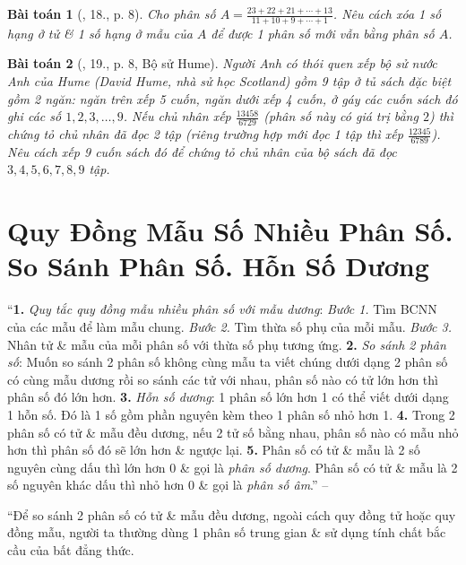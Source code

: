 \documentclass{article}
\newtheorem{baitoan}{Bài toán}
\begin{document}
\begin{baitoan}[\cite{Binh_Toan_6_tap_2}, 18., p. 8]
	Cho phân số $A = \frac{23 + 22 + 21 + \cdots + 13}{11 + 10 + 9 + \cdots + 1}$. Nêu cách xóa 1 số hạng ở tử \& 1 số hạng ở mẫu của $A$ để được 1 phân số mới vẫn bằng phân số $A$.
\end{baitoan}

\begin{baitoan}[\cite{Binh_Toan_6_tap_2}, 19., p. 8, Bộ sử Hume]
	Người Anh có thói quen xếp bộ sử nước Anh của Hume (David Hume, nhà sử học Scotland) gồm 9 tập ở tủ sách đặc biệt gồm 2 ngăn: ngăn trên xếp 5 cuốn, ngăn dưới xếp 4 cuốn, ở gáy các cuốn sách đó ghi các số $1,2,3,\ldots,9$. Nếu chủ nhân xếp $\frac{13458}{6729}$ (phân số này có giá trị bằng $2$) thì chứng tỏ chủ nhân đã đọc 2 tập (riêng trường hợp mới đọc 1 tập thì xếp $\frac{12345}{6789}$). Nêu cách xếp 9 cuốn sách đó để chứng tỏ chủ nhân của bộ sách đã đọc $3,4,5,6,7,8,9$ tập.
\end{baitoan}


\section{Quy Đồng Mẫu Số Nhiều Phân Số. So Sánh Phân Số. Hỗn Số Dương}
``\textbf{1.} \textit{Quy tắc quy đồng mẫu nhiều phân số với mẫu dương}: \textit{Bước 1.} Tìm BCNN của các mẫu để làm mẫu chung. \textit{Bước 2.} Tìm thừa số phụ của mỗi mẫu. \textit{Bước 3.} Nhân tử \& mẫu của mỗi phân số với thừa số phụ tương ứng. \textbf{2.} \textit{So sánh 2 phân số}: Muốn so sánh 2 phân số không cùng mẫu ta viết chúng dưới dạng 2 phân số có cùng mẫu dương rồi so sánh các tử với nhau, phân số nào có tử lớn hơn thì phân số đó lớn hơn. \textbf{3.} \textit{Hỗn số dương}: 1 phân số lớn hơn 1 có thể viết dưới dạng 1 hỗn số. Đó là 1 số gồm phần nguyên kèm theo 1 phân số nhỏ hơn 1. \textbf{4.} Trong 2 phân số có tử \& mẫu đều dương, nếu 2 tử số bằng nhau, phân số nào có mẫu nhỏ hơn thì phân số đó sẽ lớn hơn \& ngược lại. \textbf{5.} Phân số có tử \& mẫu là 2 số nguyên cùng dấu thì lớn hơn 0 \& gọi là \textit{phân số dương}. Phân số có tử \& mẫu là 2 số nguyên khác dấu thì nhỏ hơn 0 \& gọi là \textit{phân số âm}.'' -- \cite[Chap. III, \S2, p. 48]{Tuyen_Toan_6}

``Để so sánh 2 phân số có tử \& mẫu đều dương, ngoài cách quy đồng tử hoặc quy đồng mẫu, người ta thường dùng 1 phân số trung gian \& sử dụng tính chất bắc cầu của bất đẳng thức.
\end{document}
